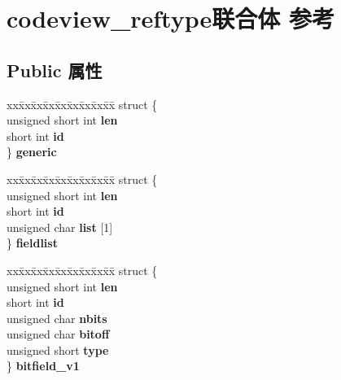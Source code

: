 \hypertarget{unioncodeview__reftype}{}\section{codeview\+\_\+reftype联合体 参考}
\label{unioncodeview__reftype}
\subsection*{Public 属性}
\begin{DoxyCompactItemize}
\item 
\mbox{\label{unioncodeview__reftype_af4f02df088a70d98d4278069ecf2a05c}} 
\begin{tabbing}
xx\=xx\=xx\=xx\=xx\=xx\=xx\=xx\=xx\=\kill
struct \{\\
\>unsigned short int {\bfseries len}\\
\>short int {\bfseries id}\\
\} {\bfseries generic}\\

\end{tabbing}\item 
\mbox{\label{unioncodeview__reftype_a909a9e04b7ebb79179bd051f905b6108}} 
\begin{tabbing}
xx\=xx\=xx\=xx\=xx\=xx\=xx\=xx\=xx\=\kill
struct \{\\
\>unsigned short int {\bfseries len}\\
\>short int {\bfseries id}\\
\>unsigned char {\bfseries list} \mbox{[}1\mbox{]}\\
\} {\bfseries fieldlist}\\

\end{tabbing}\item 
\mbox{\label{unioncodeview__reftype_adf85298bf9dd7c4a98787009cf7f64c8}} 
\begin{tabbing}
xx\=xx\=xx\=xx\=xx\=xx\=xx\=xx\=xx\=\kill
struct \{\\
\>unsigned short int {\bfseries len}\\
\>short int {\bfseries id}\\
\>unsigned char {\bfseries nbits}\\
\>unsigned char {\bfseries bitoff}\\
\>unsigned short {\bfseries type}\\
\} {\bfseries bitfield\_v1}\\


\end{tabbing}
\end{DoxyCompactItemize}

